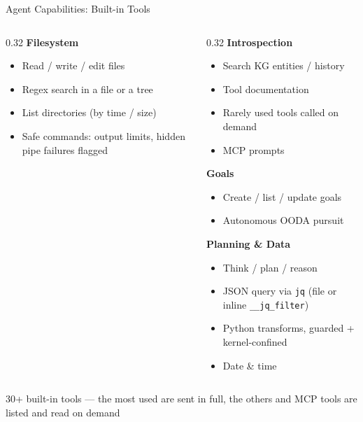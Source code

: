 \documentclass[aspectratio=169,10pt]{beamer}
\begin{document}
\begin{frame}{Agent Capabilities: Built-in Tools}
\begin{columns}[T]
\begin{column}{0.32\textwidth}
\smallskip
\textbf{\color{rhorange}Filesystem}
\begin{itemize}\scriptsize\setlength{\itemsep}{0pt}
  \item Read / write / edit files
  \item Regex search in a file or a tree
  \item List directories (by time / size)
  \item Safe commands: output limits, hidden pipe failures flagged
\end{itemize}
\end{column}
\begin{column}{0.32\textwidth}
\textbf{\color{rhpurple}Introspection}
\begin{itemize}\scriptsize\setlength{\itemsep}{0pt}
  \item Search KG entities / history
  \item Tool documentation
  \item Rarely used tools called on demand
  \item MCP prompts
\end{itemize}

\smallskip
\textbf{\color{rhteal}Goals}
\begin{itemize}\scriptsize\setlength{\itemsep}{0pt}
  \item Create / list / update goals
  \item Autonomous OODA pursuit
\end{itemize}

\smallskip
\textbf{\color{rhdarkgray}Planning \& Data}
\begin{itemize}\scriptsize\setlength{\itemsep}{0pt}
  \item Think / plan / reason
  \item JSON query via \texttt{jq} (file or inline \texttt{\_\_jq\_filter})
  \item Python transforms, guarded + kernel-confined
  \item Date \& time
\end{itemize}
\end{column}
\end{columns}

\vfill
\centering
\scriptsize\color{gray} 30+ built-in tools --- the most used are sent in full, the others and MCP tools are listed and read on demand
\end{frame}
\end{document}
